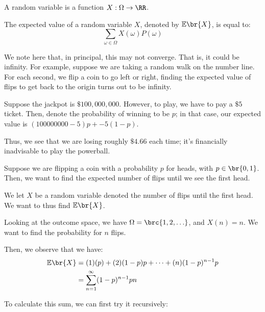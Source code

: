 \documentclass[openany]{book}
\begin{document}
\begin{defn}
	A random variable is a function $X: \Omega \rightarrow \RR$.
\end{defn}

\begin{defn}
	The expected value of a random variable $X$, denoted by $\mathbb{E}\br{X}$, is equal to:
	\begin{equation*}
		\sum_{\omega \in \Omega} X(\omega) P(\omega)
	\end{equation*}
\end{defn}

We note here that, in principal, this may not converge. That is, it could be infinity. For example, suppose we are taking a random walk on the number line. For each second, we flip a coin to go left or right, finding the expected value of flips to get back to the origin turns out to be infinity.

\begin{example}
	Suppose the jackpot is $\$100,000,000$. However, to play, we have to pay a $\$5$ ticket. Then, denote the probability of winning to be $p$; in that case, our expected value is $(100000000 - 5)p + -5(1-p)$.
	
	Thus, we see that we are losing roughly $\$4.66$ each time; it's financially inadvisable to play the powerball.
\end{example}

\begin{example}
	Suppose we are flipping a coin with a probability $p$ for heads, with $p \in \br{0, 1}$. Then, we want to find the expected number of flips until we see the first head.
	
	We let $X$ be a random variable denoted the number of flips until the first head. We want to thus find $\mathbb{E}\br{X}$.
	
	Looking at the outcome space, we have $\Omega = \brc{1, 2, \ldots}$, and $X(n) = n$. We want to find the probability for $n$ flips.
	
	Then, we observe that we have:
	\begin{align*}
		\mathbb E\br{X} &= (1)(p) + (2)(1-p)p + \cdots + (n)(1-p)^{n-1}p \\
		&= \sum_{n=1}^{\infty} (1-p)^{n-1}pn
	\end{align*}
	
	To calculate this sum, we can first try it recursively:
\end{example}
\end{document}
